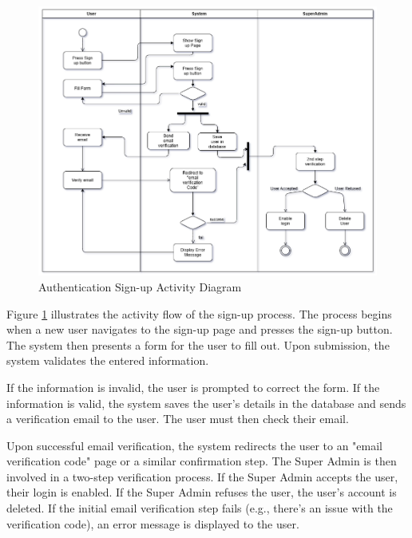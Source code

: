 \begin{figure}[ht!]
    \centering
    \includegraphics[width=1\textwidth]{images/signup_activitydiag.png}
    \caption{Authentication Sign-up Activity Diagram}
    \label{fig:signup-activity-diagram}
\end{figure}

Figure \ref{fig:signup-activity-diagram} illustrates the activity flow of the sign-up process. The process begins when a new user navigates to the sign-up page and presses the sign-up button. The system then presents a form for the user to fill out. Upon submission, the system validates the entered information. 

If the information is invalid, the user is prompted to correct the form. If the information is valid, the system saves the user's details in the database and sends a verification email to the user. The user must then check their email. 

Upon successful email verification, the system redirects the user to an "email verification code" page or a similar confirmation step. The Super Admin is then involved in a two-step verification process. If the Super Admin accepts the user, their login is enabled. If the Super Admin refuses the user, the user's account is deleted. If the initial email verification step fails (e.g., there's an issue with the verification code), an error message is displayed to the user.


